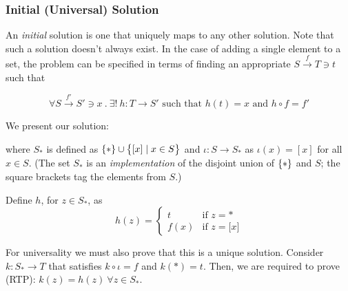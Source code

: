     \subsubsection*{Initial (Universal) Solution}
    
    An \emph{initial} solution is one that uniquely maps to any other solution.
    Note that such a solution doesn't always exist. In the case of adding a single
    element to a set, the problem can be specified in terms of finding an
    appropriate $S \overset{f}{\rightarrow} T \ni t$ such that
    
    \begin{equation*}
      \forall S \overset{f'}{\rightarrow} S' \ni x \ .\ 
      \exists!\ h : T \rightarrow S' \text{ such that }
      h(t) = x \text{ and }
      h \circ f = f'
    \end{equation*}
    
    We present our solution:
    \begin{center}
    \end{center}
    
    where $S_\ast$ is defined as 
    $\{  \ast  \} \cup \big\{  \lbrack x\rbrack \mid x \in S  \big\}$
    and $\iota: S \to S_\ast$ as $\iota(x)=[x]$ for all $x\in S$.  
    (The set $S_\ast$ is an \emph{implementation} of the disjoint union of
    $\{ * \}$ and $S$; the square brackets tag the elements from $S$.)
    
    Define $h$, for $z\in S_\ast$, as
    \begin{equation*}
        h(z) = \begin{cases}
            t & \text{if } z = \ast\\
            f(x) & \text{if } z = \lbrack x \rbrack 
        \end{cases}
    \end{equation*}
    
    For universality we must also prove that this is a unique solution.
    Consider $k:S_\ast\to T$ that satisfies $k \circ \iota = f$ and 
    $k(\ast) = t$. Then, we are required to prove (RTP):
    $k(z) = h(z)\ \forall z \in S_\ast$.
    
